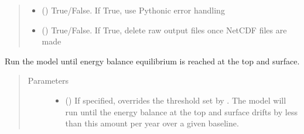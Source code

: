 \documentclass[letterpaper,10pt,english]{sphinxmanual}
\begin{document}
\begin{fulllineitems}
\begin{fulllineitems}
\begin{quote}
\begin{description}
\begin{itemize}
\item {} 
 (\sphinxstyleliteralemphasis{\sphinxupquote{, }}) \textendash{} True/False. If True, use Pythonic error handling

\item {} 
 (\sphinxstyleliteralemphasis{\sphinxupquote{, }}) \textendash{} True/False. If True, delete raw output files once NetCDF files are made

\end{itemize}

\end{description}\end{quote}

\end{fulllineitems}


\begin{fulllineitems}
\label{\detokenize{source/exoplasim:exoplasim.Model.runtobalance}}
Run the model until energy balance equilibrium is reached at the top and surface.
\begin{quote}\begin{description}
\item[{Parameters}] \leavevmode\begin{itemize}
\item {} 
 (\sphinxstyleliteralemphasis{\sphinxupquote{, }}) \textendash{} If specified, overrides the threshold set by . The model will run
until the energy balance at the top and surface drifts by less than this
amount per year over a given baseline.


\end{itemize}
\end{description}
\end{quote}
\end{fulllineitems}
\end{fulllineitems}
\end{document}
